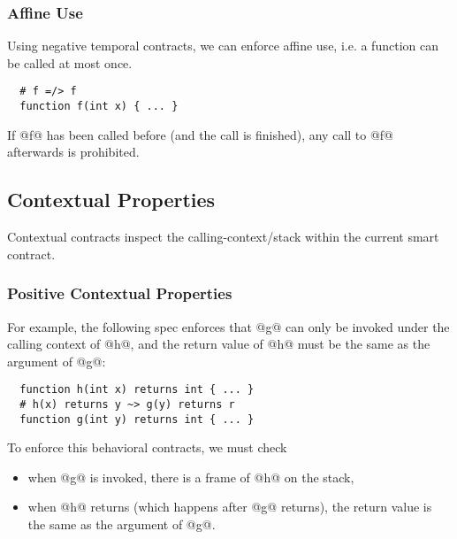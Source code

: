 \documentclass[acmsmall,review,anonymous]{acmart}\settopmatter{printfolios=true,printccs=false,printacmref=false}
\begin{document}
\subsubsection*{Affine Use}

Using negative temporal contracts, we can enforce affine use, i.e.
a function can be called at most once.
\begin{lstlisting}
  # f =/> f
  function f(int x) { ... }
\end{lstlisting}
If @f@ has been called before (and the call is finished), any
call to @f@ afterwards is prohibited.



\subsection{Contextual Properties}

Contextual contracts inspect the calling-context/stack within the
current smart contract.


\subsubsection{Positive Contextual Properties}

For example, the following spec enforces that @g@ can only be invoked
under the calling context of @h@, and the return value of @h@ must be
the same as the argument of @g@:

\begin{lstlisting}
  function h(int x) returns int { ... }
  # h(x) returns y ~> g(y) returns r
  function g(int y) returns int { ... }
\end{lstlisting}

To enforce this behavioral contracts, we must check
\begin{itemize}
	\item when @g@ is invoked, there is a frame of @h@ on the stack,
	\item when @h@ returns (which happens after @g@ returns), the return value
	      is the same as the argument of @g@.
\end{itemize}
\end{document}
